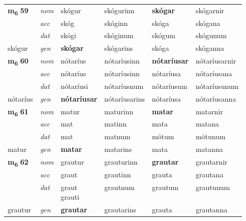 \begin{longtable}[l]{llllll}
\multirow{3}{*}{{{\textbf{m{\textsubscript{6}}} \Large{\textbf{59}}}}}  & {\footnotesize{{\textit{nom}}}} & skógur & skógurinn    & \textbf{skógar} & skógarnir  \\*
 &  {\footnotesize{{\textit{acc}}}} & skóg  & skóginn   & skóga  & skógana \\*
 &  {\footnotesize{{\textit{dat}}}} & skógi & skóginum   & skógum & skógunum \\*
 {\footnotesize{skógur}} &   {\footnotesize{{\textit{gen}}}} & \textbf{skógar}  & skógarins  & skóga & skóganna \\
\cmidrule{1-6}


\multirow{3}{*}{{{\textbf{m{\textsubscript{6}}} \Large{\textbf{60}}}}}  & {\footnotesize{{\textit{nom}}}} & nótaríus & nótaríusinn    & \textbf{nótaríusar} & nótaríusarnir  \\*
 &  {\footnotesize{{\textit{acc}}}} & nótaríus  & nótaríusinn   & nótaríusa  & nótaríusana \\*
 &  {\footnotesize{{\textit{dat}}}} & nótaríusi & nótaríusnum   & nótaríusum & nótaríusunum \\*
 {\footnotesize{nótaríus}} &   {\footnotesize{{\textit{gen}}}} & \textbf{nótaríusar}  & nótaríusarins  & nótaríusa & nótaríusanna \\
\cmidrule{1-6}


\multirow{3}{*}{{{\textbf{m{\textsubscript{6}}} \Large{\textbf{61}}}}}  & {\footnotesize{{\textit{nom}}}} & matur & maturinn    & \textbf{matar} & matarnir  \\*
 &  {\footnotesize{{\textit{acc}}}} & mat  & matinn   & mata  & matana \\*
 &  {\footnotesize{{\textit{dat}}}} & mat & matnum   & mötum & mötunum \\*
 {\footnotesize{matur}} &   {\footnotesize{{\textit{gen}}}} & \textbf{matar}  & matarins  & mata & matanna \\
\cmidrule{1-6}


\multirow{3}{*}{{{\textbf{m{\textsubscript{6}}} \Large{\textbf{62}}}}}  & {\footnotesize{{\textit{nom}}}} & grautur & grauturinn    & \textbf{grautar} & grautarnir  \\*
 &  {\footnotesize{{\textit{acc}}}} & graut  & grautinn   & grauta  & grautana \\*
 &  {\footnotesize{{\textit{dat}}}} & \specialcell{graut\\ grauti} & grautnum   & grautum & grautunum \\*
 {\footnotesize{grautur}} &   {\footnotesize{{\textit{gen}}}} & \textbf{grautar}  & grautarins  & grauta & grautanna \\
\cmidrule{1-6}



\end{longtable}
